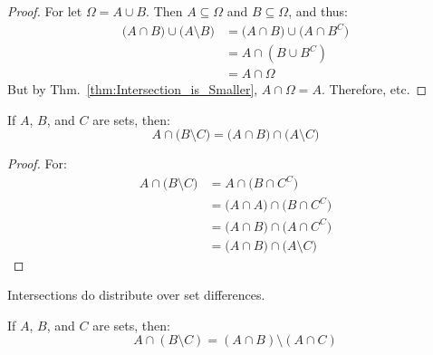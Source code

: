         \begin{proof}
            For let $\Omega=A\cup{B}$. Then
            $A\subseteq\Omega$ and $B\subseteq\Omega$,
            and thus:
            \begin{subequations}
                \begin{align}
                    \big(A\cap{B})\cup\big(A\setminus{B}\big)
                    &=\big(A\cap{B}\big)
                        \cup\big(A\cap{B}^{C}\big)\\
                    &=A\cap(B\cup{B}^{C})\\
                    &=A\cap\Omega
                \end{align}
            \end{subequations}
            But by Thm.~\ref{thm:Intersection_is_Smaller},
            $A\cap\Omega=A$. Therefore, etc.
        \end{proof}
        \begin{theorem}
            If $A$, $B$, and $C$ are sets, then:
            \begin{equation}
                A\cap\big(B\setminus{C}\big)
                =\big(A\cap{B}\big)\cap\big(A\setminus{C}\big)
            \end{equation}
        \end{theorem}
        \begin{proof}
            For:
            \begin{subequations}
                \begin{align}
                    A\cap\big(B\setminus{C}\big)
                    &=A\cap\big(B\cap{C}^{C}\big)\\
                    &=\big(A\cap{A}\big)
                        \cap\big(B\cap{C}^{C}\big)\\
                    &=\big(A\cap{B}\big)
                        \cap\big(A\cap{C}^{C}\big)\\
                    &=\big(A\cap{B}\big)
                        \cap\big(A\setminus{C}\big)
                \end{align}
            \end{subequations}
        \end{proof}
        Intersections do distribute over set differences.
        \begin{theorem}
            If $A$, $B$, and $C$ are sets, then:
            \begin{equation}
                A\cap(B\setminus{C})=
                (A\cap{B})\setminus(A\cap{C})
            \end{equation}
        \end{theorem}
